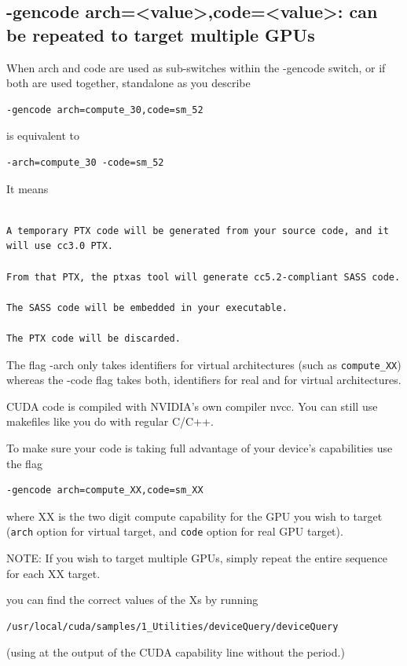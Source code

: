 \subsection{-gencode arch=<value>,code=<value>: can be repeated to target multiple GPUs}

When arch and code are used as sub-switches within the -gencode switch, or if
both are used together, standalone as you describe
\begin{verbatim}
-gencode arch=compute_30,code=sm_52
\end{verbatim}
is equivalent to
\begin{verbatim}
-arch=compute_30 -code=sm_52
\end{verbatim}
It means
\begin{verbatim}

A temporary PTX code will be generated from your source code, and it will use cc3.0 PTX.

From that PTX, the ptxas tool will generate cc5.2-compliant SASS code.

The SASS code will be embedded in your executable.

The PTX code will be discarded.

\end{verbatim}

The flag -arch only takes identifiers for virtual architectures (such as
\verb!compute_XX!) whereas the -code flag takes both, identifiers for real and for
virtual architectures.



CUDA code is compiled with NVIDIA’s own compiler nvcc. You can still use
makefiles like you do with regular C/C++. 

To make sure your code is taking full advantage of your device’s capabilities
use the flag
\begin{verbatim}
-gencode arch=compute_XX,code=sm_XX 
\end{verbatim}

where XX is the two digit compute capability for the GPU you wish to target
(\verb!arch! option for virtual target, and \verb!code! option for real GPU
target).

NOTE: If you wish to target multiple GPUs, simply repeat the entire sequence for
each XX target.


you can find the correct values of the Xs by running
\begin{verbatim}
/usr/local/cuda/samples/1_Utilities/deviceQuery/deviceQuery
\end{verbatim}
(using at the output of the CUDA capability line without the period.)

